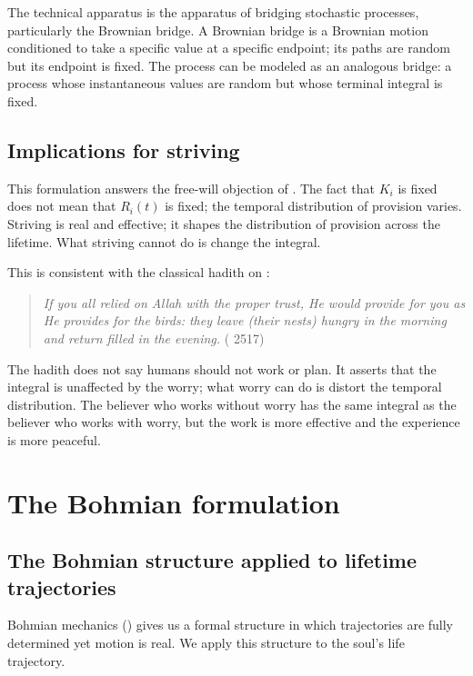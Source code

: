 The technical apparatus is the apparatus of bridging stochastic
processes, particularly the Brownian bridge. A Brownian bridge is a
Brownian motion conditioned to take a specific value at a specific
endpoint; its paths are random but its endpoint is fixed. The
 process can be modeled as an analogous bridge: a process
whose instantaneous values are random but whose terminal integral
is fixed.

\subsection{Implications for striving}

This formulation answers the free-will objection of
. The fact that $K_i$ is fixed does not
mean that $R_i(t)$ is fixed; the temporal distribution of provision
varies. Striving is real and effective; it shapes the
distribution of provision across the lifetime. What striving cannot
do is change the integral.

This is consistent with the classical hadith on :

\begin{quote}
\textit{If you all relied on Allah with the proper trust, He would
provide for you as He provides for the birds: they leave (their
nests) hungry in the morning and return filled in the evening.}
( 2517)
\end{quote}

The hadith does not say humans should not work or plan. It asserts
that the integral is unaffected by the worry; what worry can do is
distort the temporal distribution. The believer who works without
worry has the same integral as the believer who works with worry,
but the work is more effective and the experience is more peaceful.

\section{The Bohmian formulation}
\label{sec:rizq-bohmian}

\subsection{The Bohmian structure applied to lifetime trajectories}

Bohmian mechanics () gives us a formal
structure in which trajectories are fully determined yet motion is
real. We apply this structure to the soul's life trajectory.

